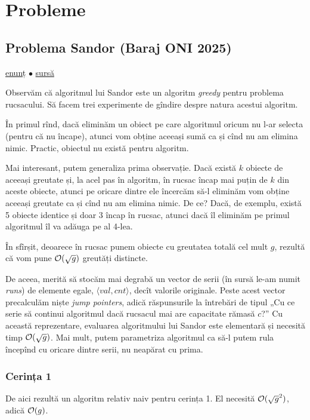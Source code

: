 \documentclass[../main.tex]{subfiles}
\begin{document}
\section{Probleme}

\subsection{Problema Sandor (Baraj ONI 2025)}
\label{problem:sandor}

\href{https://kilonova.ro/problems/3731}{enunț}
$\bullet$
\hyperref[code:sandor]{sursă}

Observăm că algoritmul lui Sandor este un algoritm \textit{greedy} pentru problema rucsacului. Să facem trei experimente de gîndire despre natura acestui algoritm.

În primul rînd, dacă eliminăm un obiect pe care algoritmul oricum nu l-ar selecta (pentru că nu încape), atunci vom obține aceeași sumă ca și cînd nu am elimina nimic. Practic, obiectul nu există pentru algoritm.

Mai interesant, putem generaliza prima observație. Dacă există $k$ obiecte de aceeași greutate și, la acel pas în algoritm, în rucsac încap mai puțin de $k$ din aceste obiecte, atunci pe oricare dintre ele încercăm să-l eliminăm vom obține aceeași greutate ca și cînd nu am elimina nimic. De ce? Dacă, de exemplu, există 5 obiecte identice și doar 3 încap în rucsac, atunci dacă îl eliminăm pe primul algoritmul îl va adăuga pe al 4-lea.

În sfîrșit, deoarece în rucsac punem obiecte cu greutatea totală cel mult $g$, rezultă că vom pune $\mathcal{O}(\sqrt{g})$ greutăți distincte.

De aceea, merită să stocăm mai degrabă un vector de serii (în sursă le-am numit \textit{runs}) de elemente egale, $\langle val, cnt \rangle$, decît valorile originale. Peste acest vector precalculăm niște \textit{jump pointers}, adică răspunsurile la întrebări de tipul „Cu ce serie să continui algoritmul dacă rucsacul mai are capacitate rămasă $c$?” Cu această reprezentare, evaluarea algoritmului lui Sandor este elementară și necesită timp $\mathcal{O}(\sqrt{g})$. Mai mult, putem parametriza algoritmul ca să-l putem rula începînd cu oricare dintre serii, nu neapărat cu prima.

\subsubsection*{Cerința 1}

De aici rezultă un algoritm relativ naiv pentru cerința 1. El necesită $\mathcal{O}(\sqrt{g}^2)$, adică $\mathcal{O}(g)$.
\end{document}
